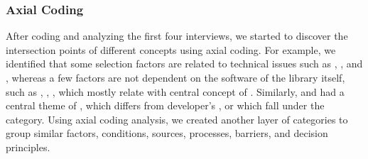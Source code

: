 \subsubsection{Axial Coding} After coding and analyzing the first four interviews, we started to discover the intersection points of different concepts using axial coding. For example, we identified that some selection factors are related to technical issues such as , , and , whereas a few factors are not dependent on the software of the library itself, such as , , , which mostly relate with central concept of . Similarly,  and  had a central theme of , which differs from developer's ,  or  which fall under the  category. Using axial coding analysis, we created another layer of categories to group similar factors, conditions, sources, processes, barriers, and decision principles. 


